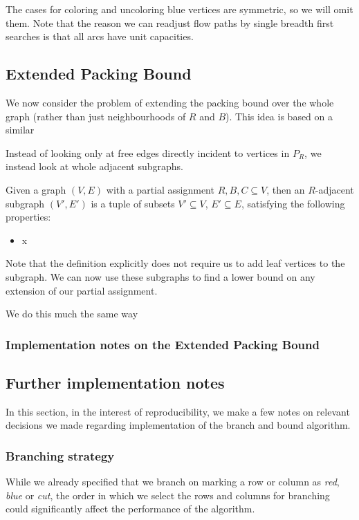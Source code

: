 \documentclass{article}
\begin{document}
	The cases for coloring and uncoloring blue vertices are symmetric, so we
	will omit them.
	Note that the reason we can readjust flow paths by single breadth first
	searches is that all arcs have unit capacities.

	\subsection{Extended Packing Bound}

	We now consider the problem of extending the packing bound over the whole
	graph (rather than just neighbourhoods of $R$ and $B$). This idea is based
	on a similar 

	Instead of looking only at free edges directly incident to vertices in
	$P_R$, we instead look at whole adjacent subgraphs.

	

	\begin{definition}
		Given a graph $(V, E)$ with a partial assignment $R, B, C \subseteq V$,
		then an $R$-adjacent subgraph $(V', E')$ is a tuple of subsets
		$V' \subseteq V$, $E' \subseteq E$, satisfying the following
		properties:
		\begin{itemize}
			\item x
		\end{itemize}
	\end{definition}

	Note that the definition explicitly does not require us to add leaf
	vertices to the subgraph. We can now use these subgraphs to find a lower
	bound on any extension of our partial assignment.

	We do this much the same way 

	\subsubsection{Implementation notes on the Extended Packing Bound}

	\subsection{Further implementation notes}

	In this section, in the interest of reproducibility, we make a few notes
	on relevant decisions we made regarding implementation of the branch and
	bound algorithm.

	\subsubsection{Branching strategy}
	While we already specified that we branch on marking a row or column as
	\textit{red}, \textit{blue} or \textit{cut}, the order in which we
	select the rows and columns for branching could significantly affect the
	performance of the algorithm.
\end{document}
